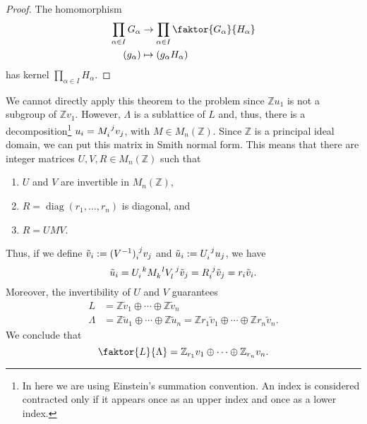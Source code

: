 \documentclass{article}
\DeclareMathOperator{\diag}{\textrm{diag}}
\begin{document}
\begin{proof}
The homomorphism
\begin{equation}
    \begin{aligned}
    \prod_{\alpha\in I} G_\alpha&\rightarrow\prod_{\alpha\in I}\faktor{G_\alpha}{H_\alpha}\\
    (g_\alpha)&\mapsto (g_\alpha H_\alpha)
    \end{aligned}
\end{equation}
has kernel $\prod_{\alpha\in I}H_\alpha$.
\end{proof}
We cannot directly apply this theorem to the problem since $\mathbb{Z}u_1$ is not a subgroup of $\mathbb{Z}v_1$. However, $\Lambda$ is a sublattice of $L$ and, thus, there is a decomposition\footnote{In here we are using Einstein's summation convention. An index is considered contracted only if it appears once as an upper index and once as a lower index.} $u_i=M\indices{_i^j}v_j$, with $M\in M_n(\mathbb{Z})$. Since $\mathbb{Z}$ is a principal ideal domain, we can put this matrix in Smith normal form. This means that there are integer matrices $U,V,R\in M_n(\mathbb{Z})$ such that
\begin{enumerate}
    \item $U$ and $V$ are invertible in $M_n(\mathbb{Z})$,
    \item $R=\diag(r_1,\dots,r_n)$ is diagonal, and
    \item $R=UMV$.
\end{enumerate}
Thus, if we define $\tilde{v}_i:=(V^{-1})\indices{_i^j}v_j$ and $\tilde{u}_i:=U\indices{_i^j}u_j$, we have
\begin{equation}
    \tilde{u}_i=U\indices{_i^k}M\indices{_k^l}V\indices{_l^j}\tilde{v}_j=R\indices{_i^j}\tilde{v}_j=r_i\tilde{v}_i.
\end{equation}
Moreover, the invertibility of $U$ and $V$ guarantees
\begin{equation}
\begin{aligned}
    L&=\mathbb{Z}\tilde{v}_1\oplus\cdots\oplus\mathbb{Z}\tilde{v}_n\\
    \Lambda &=\mathbb{Z}\tilde{u}_1\oplus\cdots\oplus\mathbb{Z}\tilde{u}_n=\mathbb{Z}r_1\tilde{v}_1\oplus\cdots\oplus\mathbb{Z}r_n\tilde{v}_n.
\end{aligned}
\end{equation}
We conclude that
\begin{equation}
    \faktor{L}{\Lambda}=\mathbb{Z}_{r_1}v_1\oplus\cdots\oplus\mathbb{Z}_{r_n}v_n.
\end{equation}

\newpage
\printbibliography
\end{document}
